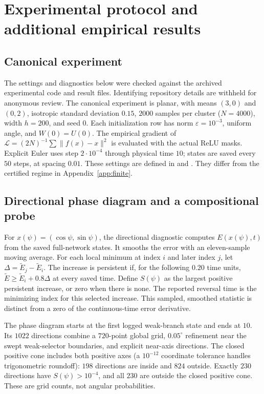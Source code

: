 \documentclass[10pt]{article}
\theoremstyle{remark}\newtheorem{remark}[theorem]{Remark}
\begin{document}
\section{Experimental protocol and additional empirical results}\label{app:empirical}
\subsection{Canonical experiment}
The settings and diagnostics below were checked against the archived
experimental code and result files. Identifying repository details are
withheld for anonymous review. The canonical
experiment is planar, with means $(3,0)$ and $(0,2)$, isotropic standard
deviation $0.15$, $2000$ samples per cluster ($N=4000$), width $h=200$,
and seed $0$. Each initialization row has norm $\varepsilon=10^{-3}$,
uniform angle, and $W(0)=U(0)$. The empirical gradient of
$\mathcal L=(2N)^{-1}\sum\|f(x)-x\|^2$ is evaluated with the actual ReLU
masks. Explicit Euler uses step $2\cdot10^{-4}$ through physical time
$10$; states are saved every $50$ steps, at spacing $0.01$.
These settings are defined in  and
.
They differ from the certified regime in Appendix~\ref{app:finite}.

\subsection{Directional phase diagram and a compositional probe}
For $x(\psi)=(\cos\psi,\sin\psi)$, the directional diagnostic computes
$E(x(\psi),t)$ from the saved full-network states. It smooths the error
with an eleven-sample moving average. For each local minimum at index $i$
and later index $j$, let $\Delta=\widetilde E_j-\widetilde E_i$.
The increase is persistent if, for the following $0.20$ time units,
$\widetilde E\ge\widetilde E_i+0.8\Delta$ at every saved time.
Define $S(\psi)$ as the largest positive persistent increase, or zero
when there is none. The reported reversal time is the minimizing index
for this selected increase. This sampled, smoothed statistic is distinct
from a zero of the continuous-time error derivative.

The phase diagram starts at the first logged weak-branch state and ends
at $10$. Its $1022$ directions combine a $720$-point global grid,
$0.05^\circ$ refinement near the swept weak-selector boundaries, and
explicit near-axis directions. The closed positive cone includes both
positive axes (a $10^{-12}$ coordinate tolerance handles trigonometric
roundoff): $198$ directions are inside and $824$ outside. Exactly $230$
directions have $S(\psi)>10^{-4}$, and all $230$ are outside the closed
positive cone. These are grid counts, not angular probabilities.
\end{document}

